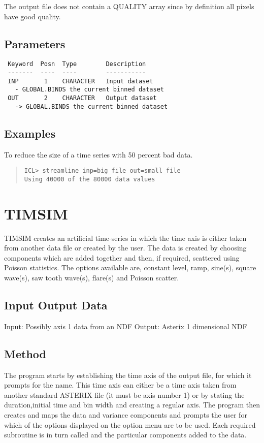 \documentclass{book}
\renewcommand{\_}{{\tt\char'137}}     %
\begin{document}
The output file does not contain a QUALITY array since by definition
all pixels have good quality.

\subsection{Parameters}
\begin{verbatim}
 Keyword  Posn  Type        Description
 -------  ----  ----        -----------
 INP       1    CHARACTER   Input dataset
   - GLOBAL.BINDS the current binned dataset
 OUT       2    CHARACTER   Output dataset
   -> GLOBAL.BINDS the current binned dataset

\end{verbatim}\subsection{Examples}
To reduce the size of a time series with 50 percent bad data.
\begin{quote}\begin{verbatim}
ICL> streamline inp=big_file out=small_file
Using 40000 of the 80000 data values
\end{verbatim}\end{quote}
\section{TIMSIM}
TIMSIM creates an artificial time-series in which the time axis is
either taken from another data file or created by the user. The data
is created by choosing components which are added together and then,
if required, scattered using Poisson statistics. The options available
are, constant level, ramp, sine(s), square wave(s), saw tooth wave(s),
flare(s) and Poisson scatter.
\subsection{Input Output Data}
Input: Possibly axis 1 data from an NDF
Output: Asterix 1 dimensional NDF
\subsection{Method}
The program starts by establishing the time axis of the output
file, for which it prompts for the name. This time axis can
either be a time axis taken from another standard ASTERIX file
(it must be axis number 1) or by stating the duration,initial
time and bin width and creating a regular axis. The program
then creates and maps the data and variance components and
prompts the user for which of the options displayed on the
option menu are to be used. Each required subroutine is in
turn called and the particular components added to the data.
\end{document}
